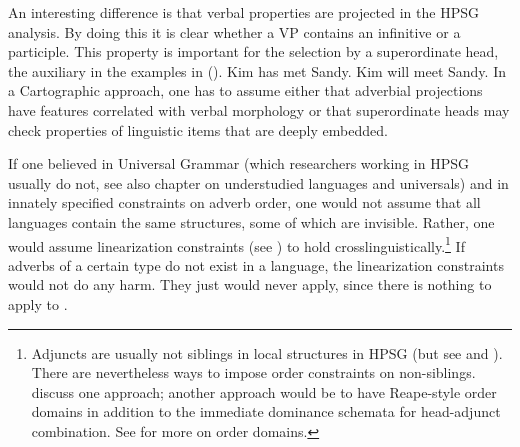 \documentclass[output=paper
 	        ,biblatex
                ,babelshorthands
                ,newtxmath
                ,draftmode
                ,colorlinks, citecolor=brown
]{langscibook}
\begin{document}
An interesting difference is that verbal properties are projected in the HPSG analysis. By doing
this it is clear whether a VP contains an infinitive or a participle.
This property is important for the selection by a superordinate head, \eg the auxiliary in the examples
in (). 
\eal
\ex Kim has met Sandy.
\ex Kim will meet Sandy.
\zl
In a Cartographic approach, one has to assume either that adverbial projections have
features correlated with verbal morphology or that superordinate heads may check
properties of linguistic items that are deeply embedded.

If one believed in Universal Grammar (which researchers working
in HPSG usually do not, see also  chapter on
  understudied languages and universals) and in innately specified constraints on adverb order, one would not assume
that all languages contain the same structures, some of which are
invisible. Rather, one would assume linearization constraints (see
) to hold crosslinguistically.\footnote{%
  Adjuncts are usually not siblings in local structures in HPSG (but see \citealt{Kasper94a} and
  \citealt[, 71]{BvN98a}). There are nevertheless ways to
  impose order constraints on non-siblings. \citet*{EEU92a} discuss one approach; another approach
  would be to have Reape-style order domains \citep{Reape94a} in addition to the immediate dominance
  schemata for head-adjunct combination. See  for more on order domains.
} If adverbs
of a certain type do not exist in a language, the linearization constraints would not do any
harm. They just would never apply, since there is nothing to apply to \citep[]{MuellerCoreGram}.
\end{document}
